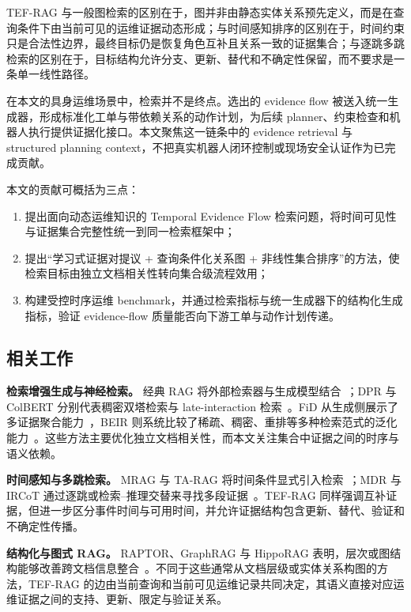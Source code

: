 TEF-RAG 与一般图检索的区别在于，图并非由静态实体关系预先定义，而是在查询条件下由当前可见的运维证据动态形成；与时间感知排序的区别在于，时间约束只是合法性边界，最终目标仍是恢复角色互补且关系一致的证据集合；与逐跳多跳检索的区别在于，目标结构允许分支、更新、替代和不确定性保留，而不要求是一条单一线性路径。

在本文的具身运维场景中，检索并不是终点。选出的 evidence flow 被送入统一生成器，形成标准化工单与带依赖关系的动作计划，为后续 planner、约束检查和机器人执行提供证据化接口。本文聚焦这一链条中的 evidence retrieval 与 structured planning context，不把真实机器人闭环控制或现场安全认证作为已完成贡献。

本文的贡献可概括为三点：
\begin{enumerate}
    \item 提出面向动态运维知识的 Temporal Evidence Flow 检索问题，将时间可见性与证据集合完整性统一到同一检索框架中；
    \item 提出“学习式证据对提议 + 查询条件化关系图 + 非线性集合排序”的方法，使检索目标由独立文档相关性转向集合级流程效用；
    \item 构建受控时序运维 benchmark，并通过检索指标与统一生成器下的结构化生成指标，验证 evidence-flow 质量能否向下游工单与动作计划传递。
\end{enumerate}

\subsection{相关工作}
\label{sec:related_work}

\textbf{检索增强生成与神经检索。}
经典 RAG 将外部检索器与生成模型结合~\cite{lewis2020rag}；DPR 与 ColBERT 分别代表稠密双塔检索与 late-interaction 检索~\cite{karpukhin2020dpr,khattab2020colbert}。FiD 从生成侧展示了多证据聚合能力~\cite{izacard2021fid}，BEIR 则系统比较了稀疏、稠密、重排等多种检索范式的泛化能力~\cite{thakur2021beir}。这些方法主要优化独立文档相关性，而本文关注集合中证据之间的时序与语义依赖。

\textbf{时间感知与多跳检索。}
MRAG 与 TA-RAG 将时间条件显式引入检索~\cite{zhang2025mrag,lau2025tarag}；MDR 与 IRCoT 通过逐跳或检索--推理交替来寻找多段证据~\cite{xiong2021mdr,trivedi2023ircot}。TEF-RAG 同样强调互补证据，但进一步区分事件时间与可用时间，并允许证据结构包含更新、替代、验证和不确定性传播。

\textbf{结构化与图式 RAG。}
RAPTOR、GraphRAG 与 HippoRAG 表明，层次或图结构能够改善跨文档信息整合~\cite{sarthi2024raptor,edge2024graphrag,gutierrez2024hipporag}。不同于这些通常从文档层级或实体关系构图的方法，TEF-RAG 的边由当前查询和当前可见运维记录共同决定，其语义直接对应运维证据之间的支持、更新、限定与验证关系。

